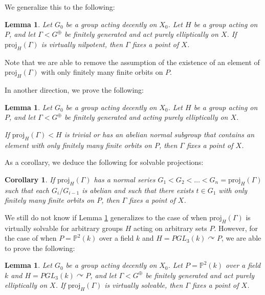 \documentclass[12pt]{article}
\newtheorem{cor}[thm]{Corollary}
\newtheorem{lem}[thm]{Lemma}
\theoremstyle{definition}
\begin{document}
We generalize this to the following:

\begin{lem}
    \label{lem: virtually nilpotent projection}
    Let $G_0$ be a group acting decently on $X_0$. Let $H$ be a group acting on $P$, and let $\Gamma < G^{\oplus}$ be finitely generated and act purely elliptically on $X$. If $\mathrm{proj}_H(\Gamma)$ is virtually nilpotent, then $\Gamma$ fixes a point of $X$.
\end{lem}

Note that we are able to remove the assumption of the existence of an element of $\mathrm{proj}_H(\Gamma)$ with only finitely many finite orbits on $P$. 

In another direction, we prove the following:

\begin{lem}
        Let $G_0$ be a group acting decently on $X_0$. Let $H$ be a group acting on $P$, and let $\Gamma < G^{\oplus}$ be finitely generated and acting purely elliptically  on $X$. 
        
        If $\mathrm{proj}_H(\Gamma) < H$ is trivial or has an abelian normal subgroup that contains an element with only finitely many finite orbits on $P$, then $\Gamma$ fixes a point of $X$. 
    \end{lem}

    As a corollary, we deduce the following for solvable projections:

    \begin{cor}
        \label{solvable lemma}
        If $\mathrm{proj}_H(\Gamma)$ has a normal series $G_1 < G_2 < \ldots < G_n = \mathrm{proj}_H(\Gamma)$ such that each $G_i/G_{i-1}$ is abelian and such that there exists $t \in G_1$ with only finitely many finite orbits on $P$, then $\Gamma$ fixes a point of $X$.
    \end{cor}

    We still do not know if Lemma \ref{lem: virtually nilpotent projection} generalizes to the case of when $\mathrm{proj}_H(\Gamma)$ is virtually solvable for arbitrary groups $H$ acting on arbitrary sets $P$. However, for the case of when $P = \mathbb{P}^2(k)$ over a field $k$ and $H = PGL_3(k) \curvearrowright P$, we are able to prove the following: 

    \begin{lem}
    \label{lem: virtually solvable projection}
    Let $G_0$ be a group acting decently on $X_0$. Let $P = \mathbb{P}^2(k)$ over a field $k$ and $H = PGL_3(k) \curvearrowright P$, and let $\Gamma < G^{\oplus}$ be finitely generated and act purely elliptically on $X$. If $\mathrm{proj}_H(\Gamma)$ is virtually solvable, then $\Gamma$ fixes a point of $X$.
\end{lem}
\end{document}
